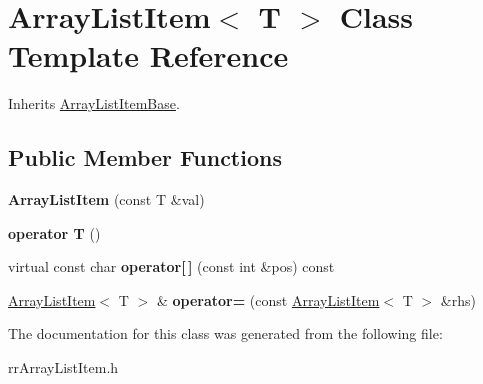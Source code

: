 \hypertarget{classrrc_1_1_array_list_item}{\section{Array\-List\-Item$<$ T $>$ Class Template Reference}
\label{classrrc_1_1_array_list_item}
}


Inherits \hyperlink{classrrc_1_1_array_list_item_base}{Array\-List\-Item\-Base}.

\subsection*{Public Member Functions}
\begin{DoxyCompactItemize}
\item 
\hypertarget{classrrc_1_1_array_list_item_a7bf1467e3a4f3b2a7acb270653deacc4}{{\bfseries Array\-List\-Item} (const T \&val)}\label{classrrc_1_1_array_list_item_a7bf1467e3a4f3b2a7acb270653deacc4}

\item 
\hypertarget{classrrc_1_1_array_list_item_a4b15b6419d4ff99730ee9df795b90f61}{{\bfseries operator T} ()}\label{classrrc_1_1_array_list_item_a4b15b6419d4ff99730ee9df795b90f61}

\item 
\hypertarget{classrrc_1_1_array_list_item_a15f637c8efc2644cb9b7da0199bebffc}{virtual const char {\bfseries operator\mbox{[}$\,$\mbox{]}} (const int \&pos) const }\label{classrrc_1_1_array_list_item_a15f637c8efc2644cb9b7da0199bebffc}

\item 
\hypertarget{classrrc_1_1_array_list_item_a54c3771ff488a9aca825037a97acf4ca}{\hyperlink{classrrc_1_1_array_list_item}{Array\-List\-Item}$<$ T $>$ \& {\bfseries operator=} (const \hyperlink{classrrc_1_1_array_list_item}{Array\-List\-Item}$<$ T $>$ \&rhs)}\label{classrrc_1_1_array_list_item_a54c3771ff488a9aca825037a97acf4ca}

\end{DoxyCompactItemize}


The documentation for this class was generated from the following file\-:\begin{DoxyCompactItemize}
\item 
rr\-Array\-List\-Item.\-h\end{DoxyCompactItemize}
